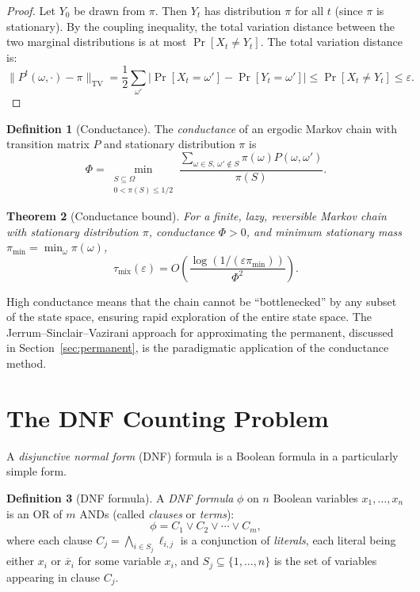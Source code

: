 \documentclass[twoside,12pt]{book}
\theoremstyle{plain}
\newtheorem{theorem}{Theorem}[chapter]
\theoremstyle{definition}
\newtheorem{definition}[theorem]{Definition}
\theoremstyle{remark}
\begin{document}
\begin{proof}
Let $Y_0$ be drawn from $\pi$. Then $Y_t$ has distribution $\pi$ for all $t$ (since $\pi$ is stationary). By the coupling inequality, the total variation distance between the two marginal distributions is at most $\Pr[X_t\neq Y_t]$. The total variation distance is:
\[
\bigl\| P^t(\omega, \cdot) - \pi \bigr\|_{\mathrm{TV}} = \frac{1}{2} \sum_{\omega'} \bigl| \Pr[X_t = \omega'] - \Pr[Y_t = \omega'] \bigr| \leq \Pr[X_t \neq Y_t] \leq \varepsilon.
\]
\end{proof}

\begin{definition}[Conductance]
The \emph{conductance} of an ergodic Markov chain with transition matrix $P$ and stationary distribution $\pi$ is
\[
\Phi = \min_{\substack{S \subseteq \Omega \\ 0 < \pi(S) \leq 1/2}} \frac{\sum_{\omega \in S, \, \omega' \notin S} \pi(\omega) P(\omega, \omega')}{\pi(S)}.
\]
\end{definition}

\begin{theorem}[Conductance bound]
\label{thm:conductance}
For a finite, lazy, reversible Markov chain with stationary distribution
$\pi$, conductance $\Phi>0$, and minimum stationary mass
$\pi_{\min}=\min_{\omega}\pi(\omega)$,
\[
\tau_{\mathrm{mix}}(\varepsilon)
 =O\!\left(\frac{\log(1/(\varepsilon\pi_{\min}))}{\Phi^2}\right).
\]
\end{theorem}

High conductance means that the chain cannot be ``bottlenecked'' by any subset of the state space, ensuring rapid exploration of the entire state space. The Jerrum--Sinclair--Vazirani approach for approximating the permanent, discussed in Section~\ref{sec:permanent}, is the paradigmatic application of the conductance method.

\section{The DNF Counting Problem}
\label{sec:dnf}

A \emph{disjunctive normal form} (DNF) formula is a Boolean formula in a particularly simple form.

\begin{definition}[DNF formula]
A \emph{DNF formula} $\phi$ on $n$ Boolean variables $x_1, \ldots, x_n$ is an OR of $m$ ANDs (called \emph{clauses} or \emph{terms}):
\[
\phi = C_1 \lor C_2 \lor \cdots \lor C_m,
\]
where each clause $C_j = \bigwedge_{i \in S_j} \ell_{i,j}$ is a conjunction of \emph{literals}, each literal being either $x_i$ or $\overline{x}_i$ for some variable $x_i$, and $S_j \subseteq \{1, \ldots, n\}$ is the set of variables appearing in clause $C_j$.
\end{definition}
\end{document}
